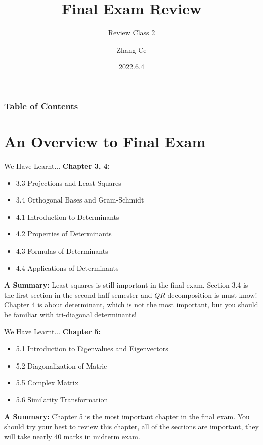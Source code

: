 \documentclass{beamer}
\title[Linear Algebra] %
{Final Exam Review}
\subtitle{Review Class 2}
\author[11910803@mail.sustech.edu.cn] %
{
    Zhang Ce
}
\institute[] %
{
    Department of Electrical and Electronic Engineering\\
    Southern University of Science and Technology
}
\date[2022.6.4] %
{2022.6.4}
\begin{document}
\frame{\titlepage}


\begin{frame}
\frametitle{Table of Contents}
\tableofcontents
\end{frame}
\section{An Overview to Final Exam}
\begin{frame}{We Have Learnt...}
\textbf{Chapter 3, 4:}
\begin{itemize}
    \item 3.3 Projections and Least Squares
    \item 3.4 Orthogonal Bases and Gram-Schmidt
    \item 4.1 Introduction to Determinants
    \item 4.2 Properties of Determinants
    \item 4.3 Formulas of Determinants
    \item 4.4 Applications of Determinants
\end{itemize}

\vspace{5pt}
\textbf{A Summary:} Least squares is still important in the final exam. Section 3.4 is the first section in the second half semester and $QR$ decomposition is must-know! Chapter 4 is about determinant, which is not the most important, but you should be familiar with tri-diagonal determinants!
\end{frame}

\begin{frame}{We Have Learnt...}
\textbf{Chapter 5:}
\begin{itemize}
    \item 5.1 Introduction to Eigenvalues and Eigenvectors
    \item 5.2 Diagonalization of Matric
    \item 5.5 Complex Matrix
    \item 5.6 Similarity Transformation
\end{itemize}

\vspace{5pt}
\textbf{A Summary:} Chapter 5 is the most important chapter in the final exam. You should try your best to review this chapter, all of the sections are important, they will take nearly 40 marks in midterm exam.
\end{frame}
\end{document}
